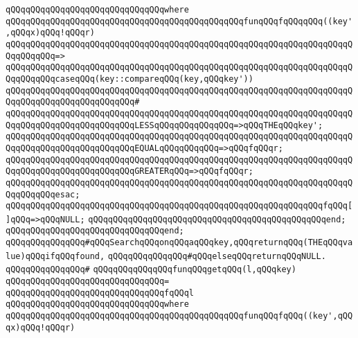 \verb|qQQqqQQqqQQqqQQqqQQqqQQqqQQqqQQqwhere|\newline
\verb|qQQqqQQqqQQqqQQqqQQqqQQqqQQqqQQqqQQqqQQqqQQqqQQqfunqQQqfqQQqqQQq((key',qQQqx)qQQq!qQQqr)|\newline
\verb|qQQqqQQqqQQqqQQqqQQqqQQqqQQqqQQqqQQqqQQqqQQqqQQqqQQqqQQqqQQqqQQqqQQqqQQqqQQqqQQq=>|\newline
\verb|qQQqqQQqqQQqqQQqqQQqqQQqqQQqqQQqqQQqqQQqqQQqqQQqqQQqqQQqqQQqqQQqqQQqqQQqqQQqqQQqcaseqQQq(key::compareqQQq(key,qQQqkey'))|\newline
\verb|qQQqqQQqqQQqqQQqqQQqqQQqqQQqqQQqqQQqqQQqqQQqqQQqqQQqqQQqqQQqqQQqqQQqqQQqqQQqqQQqqQQqqQQqqQQqqQQq#|\newline
\verb|qQQqqQQqqQQqqQQqqQQqqQQqqQQqqQQqqQQqqQQqqQQqqQQqqQQqqQQqqQQqqQQqqQQqqQQqqQQqqQQqqQQqqQQqqQQqqQQqLESSqQQqqQQqqQQqqQQq=>qQQqTHEqQQqkey';|\newline
\verb|qQQqqQQqqQQqqQQqqQQqqQQqqQQqqQQqqQQqqQQqqQQqqQQqqQQqqQQqqQQqqQQqqQQqqQQqqQQqqQQqqQQqqQQqqQQqqQQqEQUALqQQqqQQqqQQq=>qQQqfqQQqr;|\newline
\verb|qQQqqQQqqQQqqQQqqQQqqQQqqQQqqQQqqQQqqQQqqQQqqQQqqQQqqQQqqQQqqQQqqQQqqQQqqQQqqQQqqQQqqQQqqQQqqQQqGREATERqQQq=>qQQqfqQQqr;|\newline
\verb|qQQqqQQqqQQqqQQqqQQqqQQqqQQqqQQqqQQqqQQqqQQqqQQqqQQqqQQqqQQqqQQqqQQqqQQqqQQqqQQqesac;|\newline
\newline
\verb|qQQqqQQqqQQqqQQqqQQqqQQqqQQqqQQqqQQqqQQqqQQqqQQqqQQqqQQqqQQqqQQqfqQQq[]qQQq=>qQQqNULL;|\newline
\verb|qQQqqQQqqQQqqQQqqQQqqQQqqQQqqQQqqQQqqQQqqQQqqQQqend;|\newline
\verb|qQQqqQQqqQQqqQQqqQQqqQQqqQQqqQQqend;|\newline
\newline
\newline
\verb|qQQqqQQqqQQqqQQq#qQQqSearchqQQqonqQQqaqQQqkey,qQQqreturnqQQq(THEqQQqvalue)qQQqifqQQqfound,|\newline
\verb|qQQqqQQqqQQqqQQq#qQQqelseqQQqreturnqQQqNULL.|\newline
\verb|qQQqqQQqqQQqqQQq#|\newline
\verb|qQQqqQQqqQQqqQQqfunqQQqgetqQQq(l,qQQqkey)|\newline
\verb|qQQqqQQqqQQqqQQqqQQqqQQqqQQqqQQq=|\newline
\verb|qQQqqQQqqQQqqQQqqQQqqQQqqQQqqQQqfqQQql|\newline
\verb|qQQqqQQqqQQqqQQqqQQqqQQqqQQqqQQqwhere|\newline
\verb|qQQqqQQqqQQqqQQqqQQqqQQqqQQqqQQqqQQqqQQqqQQqqQQqfunqQQqfqQQq((key',qQQqx)qQQq!qQQqr)|\newline
